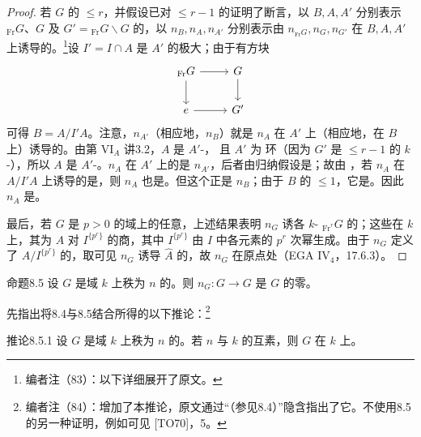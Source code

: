 \begin{proof}
若 $G$ 的 $\le r$，并假设已对 $\le r-1$ 的证明了断言，以 $B,A,A'$ 分别表示 ${}_{\operatorname{Fr}}G$、$G$ 及 $G'={}_{\operatorname{Fr}}G\backslash G$ 的，以 $n_B,n_A,n_{A'}$ 分别表示由 $n_{{}_{\operatorname{Fr}}G},n_G,n_{G'}$ 在 $B,A,A'$ 上诱导的。\footnote{编者注（83）：以下详细展开了原文。}设 $I'=I\cap A$ 是 $A'$ 的极大；由于有方块
\[
\begin{tikzcd}
 {}_{\operatorname{Fr}}G\arrow[r]\arrow[d]&G\arrow[d]\\
 e\arrow[r]&G'
\end{tikzcd}
\]
可得 $B=A/I'A$。注意，$n_{A'}$（相应地，$n_B$）就是 $n_A$ 在 $A'$ 上（相应地，在 $B$ 上）诱导的。由第 VI$_A$ 讲3.2，$A$ 是 $A'$-，
且 $A'$ 为 环（因为 $G'$ 是 $\le r-1$ 的 $k$-），所以 $A$ 是 $A'$-。$n_A$ 在 $A'$ 上的是 $n_{A'}$，后者由归纳假设是；故由 ，若 $n_A$ 在 $A/I'A$ 上诱导的是，则 $n_A$ 也是。但这个正是 $n_B$；由于 $B$ 的 $\le1$，它是。因此 $n_A$ 是。

最后，若 $G$ 是 $p>0$ 的域上的任意，上述结果表明 $n_G$ 诱各 $k$- ${}_{\operatorname{Fr}^r}G$ 的；这些在 $k$ 上，其为 $A$ 对 $I^{\{p^r\}}$ 的商，其中 $I^{\{p^r\}}$ 由 $I$ 中各元素的 $p^r$ 次幂生成。由于 $n_G$ 定义了 $A/I^{\{p^r\}}$ 的，取可见 $n_G$ 诱导 $\widehat A$ 的，故 $n_G$ 在原点处（EGA IV$_4$，17.6.3）。
\end{proof}

\begin{SGAresult}{命题}{8.5}
设 $G$ 是域 $k$ 上秩为 $n$ 的。则 $n_G:G\to G$ 是 $G$ 的零。
\end{SGAresult}
先指出将8.4与8.5结合所得的以下推论：\footnote{编者注（84）：增加了本推论，原文通过“（参见8.4）”隐含指出了它。不使用8.5的另一种证明，例如可见 [TO70]，5。}
\begin{SGAresult}{推论}{8.5.1}
设 $G$ 是域 $k$ 上秩为 $n$ 的。若 $n$ 与 $k$ 的互素，则 $G$ 在 $k$ 上。
\end{SGAresult}

